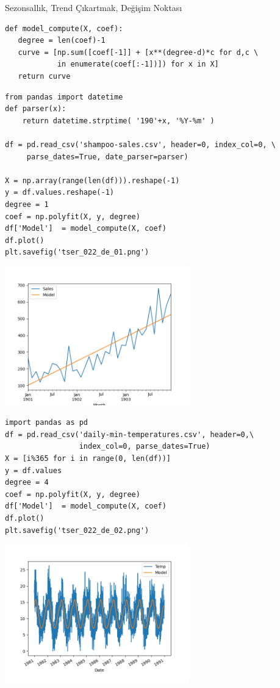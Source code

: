 \documentclass[12pt,fleqn]{article}\usepackage{../../common}
\begin{document}
Sezonsallık, Trend Çıkartmak, Değişim Noktası



\begin{verbatim}
def model_compute(X, coef):
   degree = len(coef)-1
   curve = [np.sum([coef[-1]] + [x**(degree-d)*c for d,c \
            in enumerate(coef[:-1])]) for x in X]
   return curve
\end{verbatim}


\begin{verbatim}
from pandas import datetime
def parser(x):
    return datetime.strptime( '190'+x, '%Y-%m' )
    
df = pd.read_csv('shampoo-sales.csv', header=0, index_col=0, \
     parse_dates=True, date_parser=parser)

X = np.array(range(len(df))).reshape(-1)
y = df.values.reshape(-1)
degree = 1
coef = np.polyfit(X, y, degree)
df['Model']  = model_compute(X, coef)
df.plot()
plt.savefig('tser_022_de_01.png')
\end{verbatim}


\includegraphics[height=6cm]{tser_022_de_01.png}








\begin{verbatim}
import pandas as pd
df = pd.read_csv('daily-min-temperatures.csv', header=0,\
                 index_col=0, parse_dates=True)
X = [i%365 for i in range(0, len(df))]
y = df.values
degree = 4
coef = np.polyfit(X, y, degree)
df['Model']  = model_compute(X, coef)
df.plot()
plt.savefig('tser_022_de_02.png')
\end{verbatim}






\includegraphics[height=6cm]{tser_022_de_02.png}




 
\end{document}
